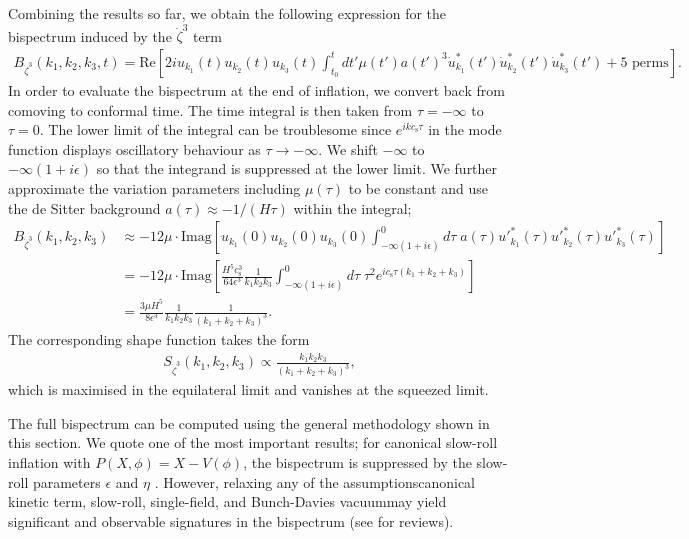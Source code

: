 Combining the results so far, we obtain the following expression for the bispectrum induced by the $\dot{\zeta}^3$ term
\begin{align}
	B_{\dot{\zeta}^3}(k_1,k_2,k_3,t) = \text{Re}\left[ 2i u_{k_1}(t) u_{k_2}(t) u_{k_3}(t) \int_{t_0}^{t} dt' \mu(t') a(t')^3 \dot{u}^*_{k_1}(t') \dot{u}^*_{k_2}(t') \dot{u}^*_{k_3}(t')   + \text{5 perms} \right].
\end{align}
In order to evaluate the bispectrum at the end of inflation, we convert back from comoving to conformal time. The time integral is then taken from $\tau=-\infty$ to $\tau=0$. The lower limit of the integral can be troublesome since $e^{i k c_\text{s} \tau}$ in the mode function displays oscillatory behaviour as $\tau\rightarrow -\infty$. We shift $-\infty$ to $-\infty(1+i\epsilon)$ so that the integrand is suppressed at the lower limit. We further approximate the variation parameters including $\mu(\tau)$ to be constant and use the de Sitter background $a(\tau)\approx -1/(H\tau)$ within the integral;
\begin{align}
	B_{\dot{\zeta}^3}(k_1,k_2,k_3) &\approx -12\mu \cdot \text{Imag}\left[  u_{k_1}(0) u_{k_2}(0) u_{k_3}(0) \int_{-\infty(1+i\epsilon)}^{0} d\tau \;  a(\tau) {u'}^*_{k_1}(\tau) {u'}^*_{k_2}(\tau) {u'}^*_{k_3}(\tau)  \right] \\
	&= -12\mu \cdot \text{Imag} \left[ \frac{H^5 c_\text{s}^3}{64\epsilon^3} \frac{1}{k_1 k_2 k_3} \int_{-\infty(1+i\epsilon)}^{0} d\tau \; \tau^2 e^{ic_\text{s}\tau(k_1+k_2+k_3)} \right] \\
	&= \frac{3\mu H^5}{8\epsilon^3} \frac{1}{k_1 k_2 k_3} \frac{1}{(k_1+k_2+k_3)^3}.
\end{align}
The corresponding shape function takes the form
\begin{align}
	S_{\dot{\zeta}^3}(k_1,k_2,k_3) \propto \frac{k_1 k_2 k_3}{(k_1+k_2+k_3)^3},
\end{align}
which is maximised in the equilateral limit and vanishes at the squeezed limit.

The full bispectrum can be computed using the general methodology shown in this section. We quote one of the most important results; for canonical slow-roll inflation with $P(X,\phi) = X - V(\phi)$, the bispectrum is suppressed by the slow-roll parameters $\epsilon$ and $\eta$ \cite{Maldacena2013}. However, relaxing any of the assumptions\textemdash canonical kinetic term, slow-roll, single-field, and Bunch-Davies vacuum\textemdash may yield significant and observable signatures in the bispectrum (see \cite{Chen2010review,Komatsu2010} for reviews).

